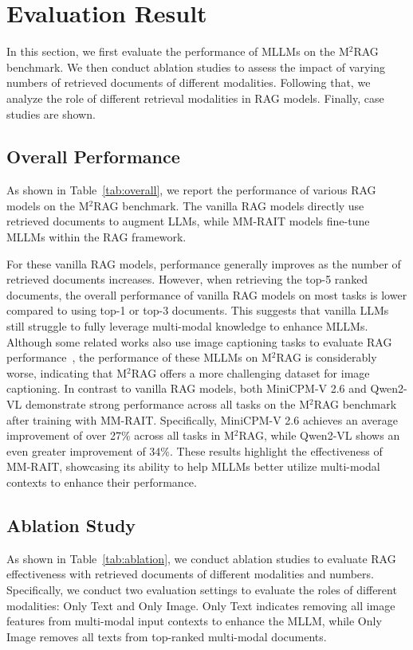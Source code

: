 
\section{Evaluation Result}
In this section, we first evaluate the performance of MLLMs on the M$^2$RAG benchmark. We then conduct ablation studies to assess the impact of varying numbers of retrieved documents of different modalities. Following that, we analyze the role of different retrieval modalities in RAG models. Finally, case studies are shown.

\subsection{Overall Performance}
As shown in Table~\ref{tab:overall}, we report the performance of various RAG models on the M$^2$RAG benchmark. The vanilla RAG models directly use retrieved documents to augment LLMs, while MM-RAIT models fine-tune MLLMs within the RAG framework.

For these vanilla RAG models, performance generally improves as the number of retrieved documents increases. However, when retrieving the top-5 ranked documents, the overall performance of vanilla RAG models on most tasks is lower compared to using top-1 or top-3 documents. This suggests that vanilla LLMs still struggle to fully leverage multi-modal knowledge to enhance MLLMs. Although some related works also use image captioning tasks to evaluate RAG performance~\cite{sharifymoghaddam2024unirag}, the performance of these MLLMs on M$^2$RAG is considerably worse, indicating that M$^2$RAG offers a more challenging dataset for image captioning.
In contrast to vanilla RAG models, both MiniCPM-V 2.6 and Qwen2-VL demonstrate strong performance across all tasks on the M$^2$RAG benchmark after training with MM-RAIT. Specifically, MiniCPM-V 2.6 achieves an average improvement of over 27\% across all tasks in M$^2$RAG, while Qwen2-VL shows an even greater improvement of 34\%. These results highlight the effectiveness of MM-RAIT, showcasing its ability to help MLLMs better utilize multi-modal contexts to enhance their performance.




\subsection{Ablation Study}
As shown in Table~\ref{tab:ablation}, we conduct ablation studies to evaluate RAG effectiveness with retrieved documents of different modalities and numbers.
Specifically, we conduct two evaluation settings to evaluate the roles of different modalities: Only Text and Only Image. Only Text indicates removing all image features from multi-modal input contexts to enhance the MLLM, while Only Image removes all texts from top-ranked multi-modal documents.

